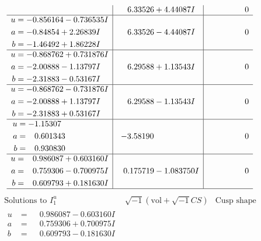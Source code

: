 \documentclass[1p]{elsarticle_modified}
\theoremstyle{definition}
\newcommand{\I}{\sqrt{-1}}
\begin{document}
$$\begin{array}{c|c|c}
 & \phantom{-}6.33526 + 4.44087 I & \phantom{-0.000000 } 0 \\ \hline\begin{aligned}
u &= -0.856164 - 0.736535 I \\
a &= -0.84854 + 2.26839 I \\
b &= -1.46492 + 1.86228 I\end{aligned}
 & \phantom{-}6.33526 - 4.44087 I & \phantom{-0.000000 } 0 \\ \hline\begin{aligned}
u &= -0.868762 + 0.731876 I \\
a &= -2.00888 - 1.13797 I \\
b &= -2.31883 - 0.53167 I\end{aligned}
 & \phantom{-}6.29588 + 1.13543 I & \phantom{-0.000000 } 0 \\ \hline\begin{aligned}
u &= -0.868762 - 0.731876 I \\
a &= -2.00888 + 1.13797 I \\
b &= -2.31883 + 0.53167 I\end{aligned}
 & \phantom{-}6.29588 - 1.13543 I & \phantom{-0.000000 } 0 \\ \hline\begin{aligned}
u &= -1.15307\phantom{ +0.000000I} \\
a &= \phantom{-}0.601343\phantom{ +0.000000I} \\
b &= \phantom{-}0.930830\phantom{ +0.000000I}\end{aligned}
 & -3.58190\phantom{ +0.000000I} & \phantom{-0.000000 } 0 \\ \hline\begin{aligned}
u &= \phantom{-}0.986087 + 0.603160 I \\
a &= \phantom{-}0.759306 - 0.700975 I \\
b &= \phantom{-}0.609793 + 0.181630 I\end{aligned}
 & \phantom{-}0.175719 - 1.083750 I & \phantom{-0.000000 } 0\\
 \hline 
 \end{array}$$\newpage$$\begin{array}{c|c|c}  
\text{Solutions to }I^u_{1}& \I (\text{vol} + \sqrt{-1}CS) & \text{Cusp shape}\\
 \hline 
\begin{aligned}
u &= \phantom{-}0.986087 - 0.603160 I \\
a &= \phantom{-}0.759306 + 0.700975 I \\
b &= \phantom{-}0.609793 - 0.181630 I\end{aligned}

\end{array}$$
\end{document}
